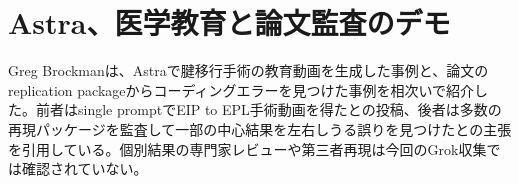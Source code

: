 \section{Astra、医学教育と論文監査のデモ}
Greg Brockmanは、Astraで腱移行手術の教育動画を生成した事例と、論文のreplication packageからコーディングエラーを見つけた事例を相次いで紹介した。前者はsingle promptでEIP to EPL手術動画を得たとの投稿、後者は多数の再現パッケージを監査して一部の中心結果を左右しうる誤りを見つけたとの主張を引用している。個別結果の専門家レビューや第三者再現は今回のGrok収集では確認されていない。
